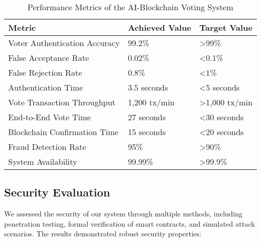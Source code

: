 \documentclass[conference]{IEEEtran}
\begin{document}
\begin{table}[!h]
\caption{Performance Metrics of the AI-Blockchain Voting System}
\label{tab:performance}
\centering
\begin{tabular}{|p{4cm}|p{2cm}|p{2cm}|}
\hline
\textbf{Metric} & \textbf{Achieved Value} & \textbf{Target Value} \\
\hline
Voter Authentication Accuracy & 99.2\% & >99\% \\
\hline
False Acceptance Rate & 0.02\% & <0.1\% \\
\hline
False Rejection Rate & 0.8\% & <1\% \\
\hline
Authentication Time & 3.5 seconds & <5 seconds \\
\hline
Vote Transaction Throughput & 1,200 tx/min & >1,000 tx/min \\
\hline
End-to-End Vote Time & 27 seconds & <30 seconds \\
\hline
Blockchain Confirmation Time & 15 seconds & <20 seconds \\
\hline
Fraud Detection Rate & 95\% & >90\% \\
\hline
System Availability & 99.99\% & >99.9\% \\
\hline
\end{tabular}
\end{table}

\subsection{Security Evaluation}
We assessed the security of our system through multiple methods, including penetration testing, formal verification of smart contracts, and simulated attack scenarios. The results demonstrated robust security properties:
\end{document}
